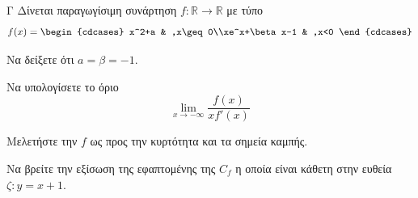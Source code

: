 \begin{thema}{Γ}
Δίνεται παραγωγίσιμη συνάρτηση $f:\mathbb{R}\to\mathbb{R}$ με τύπο
\[ f(x)=\begin{cdcases}
x^2+a & ,x\geq0\\xe^x+\beta x-1 & ,x<0
\end{cdcases} \]
\begin{erwthma}
\item Να δείξετε ότι $a=\beta=-1$.
\item Να υπολογίσετε το όριο \[ \lim\limits_{x\to-\infty}{\frac{f(x)}{xf'(x)}} \]
\item Μελετήστε την $f$ ως προς την κυρτότητα και τα σημεία καμπής.
\item Να βρείτε την εξίσωση της εφαπτομένης της $C_f$ η οποία είναι κάθετη στην ευθεία $\zeta:y=x+1$.
\end{erwthma}
\end{thema}
